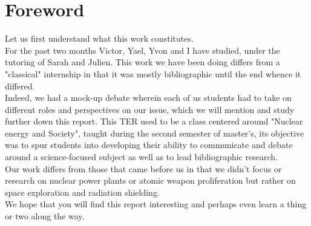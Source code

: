 \chapter*{Foreword}

Let us first understand what this work constitutes.\\


For the past two months Victor, Yael, Yvon and I have studied, under the tutoring of Sarah and Julien.
This work we have been doing differs from a "classical" internship in that it was mostly bibliographic until the end whence it differed. \\

Indeed, we had a mock-up debate wherein each of us students had to take on different roles and perspectives on our issue, which we will mention and study further down this report.
This TER used to be a class centered around "Nuclear energy and Society", taught during the second semester of master's, its objective was to spur students into developing  their ability to communicate and debate around a science-focused subject as well as to lead bibliographic research.\\

Our work differs from those that came before us in that we didn't focus or research on nuclear power plants or atomic weapon proliferation but rather on space exploration and radiation shielding.\\

We hope that you will find this report interesting and perhaps even learn a thing or two along the way.
\newpage